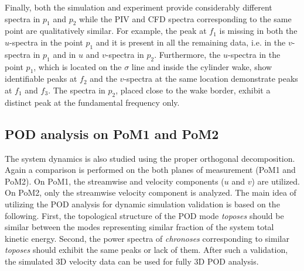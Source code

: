 
Finally, both the simulation and experiment provide considerably different spectra in $p_{1}$ and $p_{2}${ while }the {PIV and CFD} spectra corresponding to the same point {are} qualitatively similar. For example, the peak at $f_{1}$ is missing in both the $u$-spectra in {the} point $p_{1}$ and it is present in all the remaining data, i.e. in the $v$-spectra in $p_{1}$ and in $u$ and $v$-spectra in $p_{2}$. Furthermore, the $u$-spectra in {the} point $p_{1}$, which is located on the $\sigma$ line and inside the cylinder wake{,} show identifiable peaks at $f_{2}$ and the $v$-spectra at the same location demonstrate peaks at $f_{1}$ and $f_{3}$. The spectra in $p_{2}$, placed close to the wake border, exhibit a distinct peak at the fundamental frequency only.

\subsection{POD analysis on PoM1 and PoM2}
\label{sub:2DPOD}


The system dynamics is also studied using the proper orthogonal decomposition. Again a comparison is performed on the both planes of measurement (PoM1 and PoM2). On PoM1, the streamwise and  velocity components ($u$ and $v$) are utilized. {On} PoM2, {only} the streamwise velocity component is analyzed. The main idea of utilizing the POD analysis for dynamic simulation validation is based on the following. First, the topological structure of the POD mode \textit{toposes} should be similar between the modes representing similar fraction of the system total kinetic energy. Second, the power spectra of \textit{chronoses} corresponding to similar \textit{toposes} should exhibit the same peaks or lack of them. After such a validation, the simulated 3D velocity data can be used for fully 3D POD analysis.  

